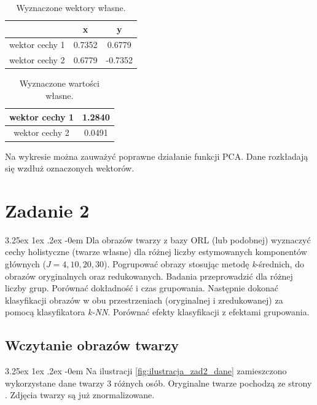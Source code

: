 \documentclass[11pt, a4paper]{article}
\makeatletter
\newcommand{\fbi}{\leavevmode{\parindent=1em\indent}}
\renewcommand\paragraph{\@startsection{paragraph}{5}{\z@}
  {3.25ex \@plus1ex \@minus.2ex}
  {-0em}
  {\normalfont\normalsize\bfseries}}
\makeatother
\begin{document}
\begin{table}[H]
	\centering
	\caption{Wyznaczone wektory własne.}
	\begin{tabular}{c|c|c|}
		\cline{2-3}
		& x & y \\ 
		\hline
		\multicolumn{1}{|c|}{wektor cechy 1} & 0.7352 & 0.6779 \\ 
		\hline 
		\multicolumn{1}{|c|}{wektor cechy 2} & 0.6779 & -0.7352 \\
		\hline 
	\end{tabular}
	\label{tab:wektory-wlasne}
\end{table}


\begin{table}[H]
	\centering
	\caption{Wyznaczone wartości własne.}
	\begin{tabular}{|c|c|}
		\hline 
		wektor cechy 1 & 1.2840 \\ 
		\hline 
		wektor cechy 2 & 0.0491 \\ 
		\hline
	\end{tabular}
	\label{tab:wartosci-wlasne}
\end{table}

\fbi
Na wykresie można zauważyć poprawne działanie funkcji PCA. Dane rozkładają się wzdłuż oznaczonych wektorów.

\section{Zadanie 2}
\paragraph{}
Dla obrazów twarzy z bazy ORL (lub podobnej) wyznaczyć cechy holistyczne (twarze własne) dla różnej liczby estymowanych komponentów głównych (\(J = 4, 10, 20, 30\)). Pogrupować obrazy stosując metodę \textit{k}-średnich, do obrazów oryginalnych oraz redukowanych. Badania przeprowadzić dla różnej liczby grup. Porównać dokładność i czas grupowania. Następnie dokonać klasyfikacji obrazów w obu przestrzeniach (oryginalnej i zredukowanej) za pomocą klasyfikatora \textit{k-NN}. Porównać efekty klasyfikacji z efektami grupowania.

\subsection{Wczytanie obrazów twarzy}
\paragraph{}
Na ilustracji \ref{fig:ilustracja_zad2_dane} zamieszczono wykorzystane dane twarzy 3 różnych osób. Oryginalne twarze pochodzą ze strony \cite{test6}. Zdjęcia twarzy są już znormalizowane.
\end{document}
